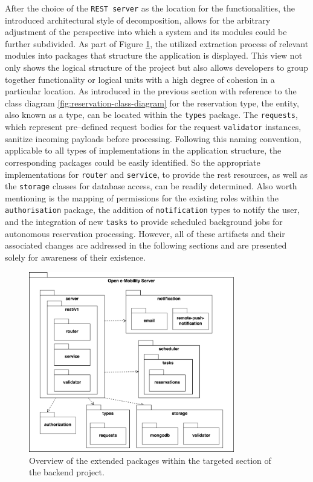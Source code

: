 After the choice of the \texttt{REST server} as the location for the functionalities, the introduced architectural style of decomposition, allows for the arbitrary adjustment of the perspective into which a system and its modules could be further subdivided.
As part of Figure \ref{fig:package-view}, the utilized extraction process of relevant modules into packages that structure the application is displayed. This view not only shows the logical structure of the project but also allows developers to group together functionality or logical units with a high degree of cohesion in a particular location.
As introduced in the previous section with reference to the class diagram \ref{fig:reservation-class-diagram} for the reservation type, the entity, also known as a type, can be located within the \texttt{types} package. 
The \texttt{requests}, which represent pre--defined request bodies for the request \texttt{validator} instances, sanitize incoming payloads before processing. Following this naming convention, applicable to all types of implementations in the application structure, the corresponding packages could be easily identified.
So the appropriate implementations for \texttt{router} and \texttt{service}, to provide the \acrshort{rest} resources, as well as the \texttt{storage} classes for database access, can be readily determined. 
Also worth mentioning is the mapping of permissions for the existing roles within the \texttt{authorisation} package, the addition of \texttt{notification} types to notify the user, and the integration of new \texttt{tasks} to provide scheduled background jobs for autonomous reservation processing.
However, all of these artifacts and their associated changes are addressed in the following sections and are presented solely for awareness of their existence.

\begin{figure}[h]
    \centering
    \includegraphics[width=0.8\textwidth,keepaspectratio]{resources/images/main/6_implementation/PackageDiagram.png}
    \caption{Overview of the extended packages within the targeted section of the backend project.}
    \label{fig:package-view}
\end{figure}


